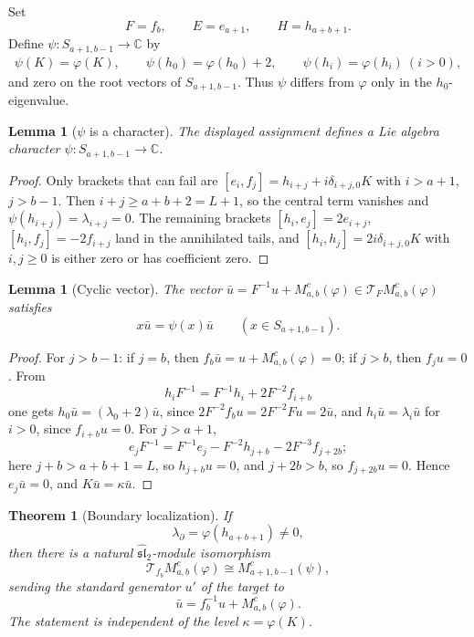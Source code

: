 \documentclass[11pt,a4paper]{article}
\newcommand{\C}{\mathbb C}
\newcommand{\slh}{\widehat{\mathfrak{sl}}_2}
\newcommand{\T}{\mathcal T}
\theoremstyle{plainupright}
\newtheorem{lemma}[proposition]{Lemma}
\newtheorem{theorem}[proposition]{Theorem}
\begin{document}
Set
\[
F=f_b,\qquad E=e_{a+1},\qquad H=h_{a+b+1}.
\]
Define \(\psi:S_{a+1,b-1}\to\C\) by
\begin{align*}
\psi(K)=\varphi(K),\qquad
\psi(h_0)=\varphi(h_0)+2,\qquad
\psi(h_i)=\varphi(h_i)\ (i>0),
\end{align*}
and zero on the root vectors of \(S_{a+1,b-1}\). Thus \(\psi\) differs from
\(\varphi\) only in the \(h_0\)-eigenvalue.

\begin{lemma}[\(\psi\) is a character]\label{lem:char}
The displayed assignment defines a Lie algebra character
\(\psi:S_{a+1,b-1}\to\C\).
\end{lemma}

\begin{proof}
Only brackets that can fail are \([e_i,f_j]=h_{i+j}+i\delta_{i+j,0}K\) with
\(i>a+1\), \(j>b-1\). Then \(i+j\ge a+b+2=L+1\), so the central term vanishes
and \(\psi(h_{i+j})=\lambda_{i+j}=0\). The remaining brackets
\([h_i,e_j]=2e_{i+j}\), \([h_i,f_j]=-2f_{i+j}\) land in the annihilated tails,
and \([h_i,h_j]=2i\delta_{i+j,0}K\) with \(i,j\ge0\) is either zero or has
coefficient zero.
\end{proof}

\begin{lemma}[Cyclic vector]\label{lem:cyc}
The vector \(\bar u=F^{-1}u+M^c_{a,b}(\varphi)\in\T_FM^c_{a,b}(\varphi)\)
satisfies
\[
x\bar u=\psi(x)\bar u\qquad(x\in S_{a+1,b-1}).
\]
\end{lemma}

\begin{proof}
For \(j>b-1\): if \(j=b\), then
\(f_b\bar u=u+M^c_{a,b}(\varphi)=0\); if \(j>b\), then \(f_ju=0\). From
\[
h_iF^{-1}=F^{-1}h_i+2F^{-2}f_{i+b}
\]
one gets \(h_0\bar u=(\lambda_0+2)\bar u\), since
\(2F^{-2}f_bu=2F^{-2}Fu=2\bar u\), and \(h_i\bar u=\lambda_i\bar u\) for
\(i>0\), since \(f_{i+b}u=0\). For \(j>a+1\),
\[
e_jF^{-1}=F^{-1}e_j-F^{-2}h_{j+b}-2F^{-3}f_{j+2b};
\]
here \(j+b>a+b+1=L\), so \(h_{j+b}u=0\), and \(j+2b>b\), so \(f_{j+2b}u=0\).
Hence \(e_j\bar u=0\), and \(K\bar u=\kappa\bar u\).
\end{proof}

\begin{theorem}[Boundary localization]\label{thm:boundary}
If
\[
\lambda_\partial=\varphi(h_{a+b+1})\ne0,
\]
then there is a natural \(\slh\)-module isomorphism
\[
\boxed{\ \T_{f_b}M^c_{a,b}(\varphi)\cong M^c_{a+1,b-1}(\psi),\ }
\]
sending the standard generator \(u'\) of the target to
\[
\bar u=f_b^{-1}u+M^c_{a,b}(\varphi).
\]
The statement is independent of the level \(\kappa=\varphi(K)\).
\end{theorem}
\end{document}
